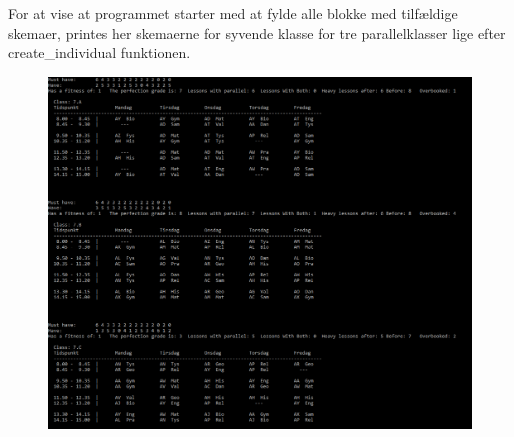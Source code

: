 For at vise at programmet starter med at fylde alle blokke med tilfældige skemaer, printes her skemaerne for syvende klasse for tre parallelklasser lige efter create\_individual funktionen.

\begin{figure}[!ht]
\includegraphics{partials/graphics/startsskema.png}
\label{fig:startsskema}
\end{figure}